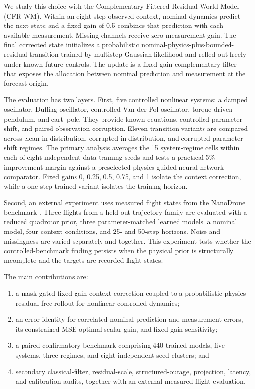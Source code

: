 \documentclass[iicol,pdflatex,sn-basic,Numbered]{sn-jnl}
\newcommand{\method}{CFR-WM}
\newcommand{\ConfirmatoryRuns}{440}
\begin{document}
We study this choice with the Complementary-Filtered Residual World Model
(\method). Within an eight-step observed context, nominal dynamics predict the
next state and a fixed gain of 0.5 combines that prediction with each available
measurement. Missing channels receive zero measurement gain. The final
corrected state initializes a probabilistic nominal-physics-plus-bounded-
residual transition trained by multistep Gaussian likelihood and rolled out
freely under known future controls. The update is a fixed-gain complementary
filter that exposes the allocation between nominal prediction and measurement
at the forecast origin.

The evaluation has two layers. First, five controlled nonlinear systems: a
damped oscillator, Duffing oscillator, controlled Van der Pol oscillator,
torque-driven pendulum, and cart--pole. They provide known equations, controlled
parameter shift, and paired observation corruption. Eleven transition variants
are compared across clean in-distribution, corrupted in-distribution, and
corrupted parameter-shift regimes. The primary analysis averages the 15
system-regime cells within each of eight independent data-training seeds and
tests a practical 5\% improvement margin against a preselected physics-guided
neural-network comparator. Fixed gains 0, 0.25, 0.5, 0.75, and 1 isolate the
context correction, while a one-step-trained variant isolates the training
horizon.

Second, an external experiment uses measured flight states from the NanoDrone
benchmark \cite{busetto2026_nanodrone}. Three flights from a held-out
trajectory family are evaluated with a reduced quadrotor prior, three
parameter-matched learned models, a nominal model, four context conditions, and
25- and 50-step horizons. Noise and missingness are varied separately and
together. This experiment tests whether the controlled-benchmark finding
persists when the physical prior is structurally incomplete and the targets are
recorded flight states.

The main contributions are:
\begin{enumerate}
 \item a mask-gated fixed-gain context correction coupled to a probabilistic
 physics-residual free rollout for nonlinear controlled dynamics;
 \item an error identity for correlated nominal-prediction and measurement
 errors, its constrained MSE-optimal scalar gain, and fixed-gain sensitivity;
 \item a paired confirmatory benchmark comprising \ConfirmatoryRuns{} trained
 models, five systems, three regimes, and eight independent seed clusters; and
 \item secondary classical-filter, residual-scale, structured-outage,
 projection, latency, and calibration audits, together with an external
 measured-flight evaluation.
\end{enumerate}
\end{document}
